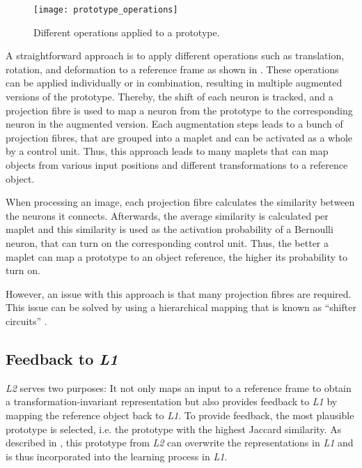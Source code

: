 \begin{figure}[h]
    \centering
    \texttt{[image: prototype\_operations]}
    \caption[Operations applied to a prototype]{Different operations applied to a prototype.}
\end{figure}
A straightforward approach is to apply different operations such as translation, rotation, and deformation to a reference frame as shown in . These operations can be applied individually or in combination, resulting in multiple augmented versions of the prototype.
Thereby, the shift of each neuron is tracked, and a projection fibre is used to map a neuron from the prototype to the corresponding neuron in the augmented version.
Each augmentation steps leads to a bunch of projection fibres, that are grouped into a maplet and can be activated as a whole by a control unit.
Thus, this approach leads to many maplets that can map objects from various input positions and different transformations to a reference object.

When processing an image, each projection fibre calculates the similarity between the neurons it connects.
Afterwards, the average similarity is calculated per maplet and this similarity is used as the activation probability of a Bernoulli neuron, that can turn on the corresponding control unit.
Thus, the better a maplet can map a prototype to an object reference, the higher its probability to turn on.

However, an issue with this approach is that many projection fibres are required.
This issue can be solved by using a hierarchical mapping that is known as ``shifter circuits''  .



\subsection{Feedback to \emph{L1}}
\emph{L2} serves two purposes: It not only maps an input to a reference frame to obtain a transformation-invariant representation but also provides feedback to \emph{L1} by mapping the reference object back to \emph{L1}.
To provide feedback, the most plausible prototype is selected, i.e. the prototype with the highest Jaccard similarity.
As described in , this prototype from \emph{L2} can overwrite the representations in \emph{L1} and is thus incorporated into the learning process in \emph{L1}.

